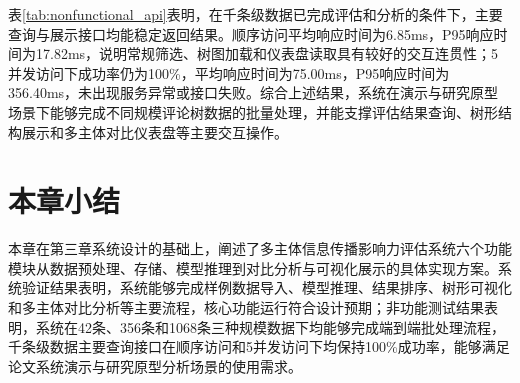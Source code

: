 表\ref{tab:nonfunctional_api}表明，在千条级数据已完成评估和分析的条件下，主要查询与展示接口均能稳定返回结果。顺序访问平均响应时间为6.85ms，P95响应时间为17.82ms，说明常规筛选、树图加载和仪表盘读取具有较好的交互连贯性；5并发访问下成功率仍为100\%，平均响应时间为75.00ms，P95响应时间为356.40ms，未出现服务异常或接口失败。综合上述结果，系统在演示与研究原型场景下能够完成不同规模评论树数据的批量处理，并能支撑评估结果查询、树形结构展示和多主体对比仪表盘等主要交互操作。

\section{本章小结}

本章在第三章系统设计的基础上，阐述了多主体信息传播影响力评估系统六个功能模块从数据预处理、存储、模型推理到对比分析与可视化展示的具体实现方案。系统验证结果表明，系统能够完成样例数据导入、模型推理、结果排序、树形可视化和多主体对比分析等主要流程，核心功能运行符合设计预期；非功能测试结果表明，系统在42条、356条和1068条三种规模数据下均能够完成端到端批处理流程，千条级数据主要查询接口在顺序访问和5并发访问下均保持100\%成功率，能够满足论文系统演示与研究原型分析场景的使用需求。
